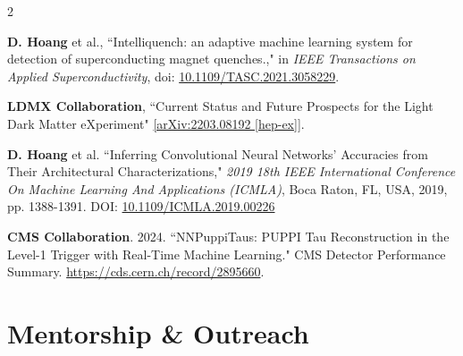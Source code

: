 \documentclass[a4paper,11pt]{article}
\newcommand{\resumeItem}[2]{
  \item{
    \textbf{#1}{\hspace{0.5mm}#2 \vspace{-0.5mm}}
  }
}
\newcommand{\resumeSubItem}[2]{\resumeItem{#1}{#2}\vspace{-4pt}}
\newcommand{\resumeHeadingSkillStart}{\begin{itemize}[leftmargin=*,itemsep=1.7mm, rightmargin=2ex]}
\newcommand{\resumeHeadingSkillEnd}{\end{itemize}\vspace{-2mm}}
\begin{document}
{\begin{multicols}{2}
\begin{enumerate}[leftmargin=*, labelsep=0.5em, align=left, widest={[\textbf{S.1}]}, itemindent=0em, label={\textbf{[\arabic*]}}]
\item \textbf{D. Hoang} et al., ``Intelliquench: an adaptive machine learning system for detection of superconducting magnet quenches.," in \emph{IEEE Transactions on Applied Superconductivity}, doi: \url{10.1109/TASC.2021.3058229}.


\item \textbf{LDMX Collaboration}, ``Current Status and Future Prospects for the Light Dark Matter eXperiment" \url{[arXiv:2203.08192 [hep-ex]]}.

\item \textbf{D. Hoang} et al. ``Inferring Convolutional Neural Networks' Accuracies from Their Architectural Characterizations," \emph{2019 18th IEEE International Conference On Machine Learning And Applications (ICMLA)}, Boca Raton, FL, USA, 2019, pp. 1388-1391. DOI: \url{10.1109/ICMLA.2019.00226}

\item \textbf{CMS Collaboration}. 2024. ``NNPuppiTaus: PUPPI Tau Reconstruction in the Level-1 Trigger with Real-Time Machine Learning." CMS Detector Performance Summary. \url{https://cds.cern.ch/record/2895660}.

\end{enumerate}
\end{multicols}




\section{\textbf{Mentorship \& Outreach}}

}
\end{document}
